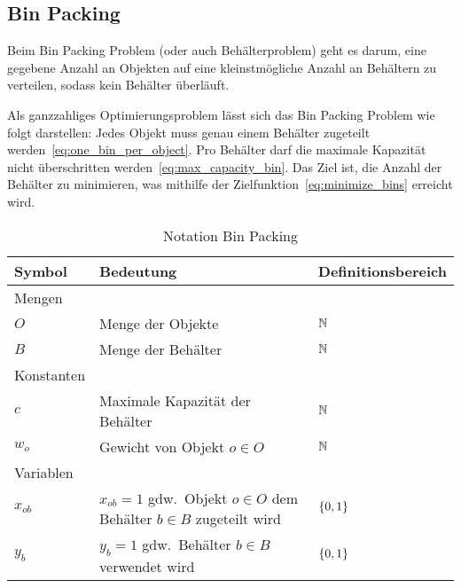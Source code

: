 \subsection{Bin Packing}\label{subsec:bin-packing}

Beim Bin Packing Problem (oder auch Behälterproblem) geht es darum, eine gegebene Anzahl an Objekten auf eine
kleinstmögliche Anzahl an Behältern zu verteilen, sodass kein Behälter überläuft.

Als ganzzahliges Optimierungsproblem lässt sich das Bin Packing Problem wie folgt darstellen:
Jedes Objekt muss genau einem Behälter zugeteilt werden~\eqref{eq:one_bin_per_object}.
Pro Behälter darf die maximale Kapazität nicht überschritten werden~\eqref{eq:max_capacity_bin}.
Das Ziel ist, die Anzahl der Behälter zu minimieren, was mithilfe der Zielfunktion~\eqref{eq:minimize_bins} erreicht wird.


\begin{table}[H]
    \begin{tabularx}{\textwidth}{  l | X | l }
    Symbol & Bedeutung & Definitionsbereich \\\hline\hline
    Mengen & & \\\hline\hline
    $O$ & Menge der Objekte & $\mathbb{N}$\\\hline
    $B$ & Menge der Behälter & $\mathbb{N}$\\\hline\hline
    Konstanten &  &  \\\hline\hline
    $c$ & Maximale Kapazität der Behälter & $\mathbb{N}$\\\hline
    $w_o$ & Gewicht von Objekt $o\in O$ & $\mathbb{N}$\\\hline\hline
    Variablen &  &  \\\hline\hline
    $x_{ob}$ & $x_{ob}=1$ gdw.\ Objekt $o\in O$ dem Behälter $b\in B$ zugeteilt wird & $\{0,1\}$\\\hline
    $y_b$ & $y_b=1$ gdw.\ Behälter $b\in B$ verwendet wird & $\{0,1\}$\\\hline
    \end{tabularx}
    \caption{Notation Bin Packing}\label{tab:notation_bin_packing}
\end{table}


